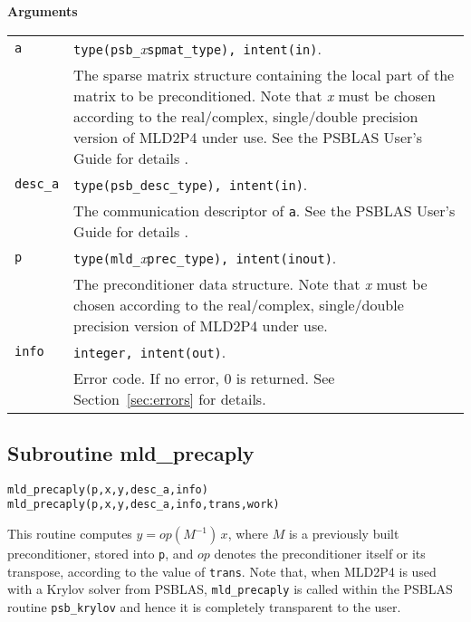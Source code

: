 {\baselineskip\noindent\large\bfseries Arguments}

\begin{tabular}{p{1.2cm}p{12cm}}
\verb|a|      & \verb|type(psb_|\emph{x}\verb|spmat_type), intent(in)|. \\
              & The sparse matrix structure containing the local part of the
                matrix to be preconditioned. Note that \emph{x} must be chosen according
                to the real/complex, 
single/double precision version of MLD2P4 under use.
                See the PSBLAS User's Guide for details \cite{PSBLASGUIDE}.\\
\verb|desc_a| & \verb|type(psb_desc_type), intent(in)|. \\
              & The communication descriptor of \verb|a|. See the PSBLAS User's Guide for
                details \cite{PSBLASGUIDE}.\\
\verb|p|      & \verb|type(mld_|\emph{x}\verb|prec_type), intent(inout)|.\\
              & The preconditioner data structure. Note that \emph{x} must be chosen according
                to the real/complex, single/double precision version of MLD2P4 under use.\\
\verb|info|   & \verb|integer, intent(out)|.\\
              & Error code. If no error, 0 is returned. See Section~\ref{sec:errors} for details.\\
\end{tabular}

\clearpage
\subsection{Subroutine mld\_precaply\label{sec:precaply}}

\begin{center}
\verb|mld_precaply(p,x,y,desc_a,info)|\\
\verb|mld_precaply(p,x,y,desc_a,info,trans,work)|\\
\end{center}

\noindent
This routine computes $y = op(M^{-1})\, x$, where $M$ is a previously built
preconditioner, stored into \verb|p|, and $op$
denotes the preconditioner itself or its transpose, according to
the value of \verb|trans|.
Note that, when MLD2P4 is used with a Krylov solver from PSBLAS,
\verb|mld_precaply| is called within the PSBLAS routine \verb|psb_krylov|
and hence it is completely transparent to the user.

